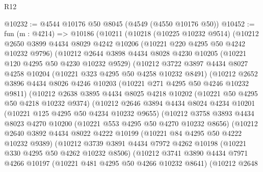 \begin{lexlean}{R12}
\begin{coremodule}
@10232 := @4544 @10176 @50 @8045 (@4549 (@4550 @10176 @50))
@10452 := fun (m : @4214) =>
  @10186
    (@10211
      (@10218
        (@10225 @10232 @9514)
        (@10212
          @2650
          @3899
          @4434
          @8029
          @4242
          @10206
          (@10221 @220 @4295 @50 @4242 @10232 @9796)
          (@10212
            @2644
            @3898
            @4434
            @8028
            @4230
            @10205
            (@10221 @120 @4295 @50 @4230 @10232 @9529)
            (@10212
              @3722
              @3897
              @4434
              @8027
              @4258
              @10204
              (@10221 @323 @4295 @50 @4258 @10232 @8491)
              (@10212
                @2652
                @3896
                @4434
                @8026
                @4246
                @10203
                (@10221 @271 @4295 @50 @4246 @10232 @9811)
                (@10212
                  @2638
                  @3895
                  @4434
                  @8025
                  @4218
                  @10202
                  (@10221 @50 @4295 @50 @4218 @10232 @9374)
                  (@10212
                    @2646
                    @3894
                    @4434
                    @8024
                    @4234
                    @10201
                    (@10221 @125 @4295 @50 @4234 @10232 @9655)
                    (@10212
                      @3758
                      @3893
                      @4434
                      @8023
                      @4270
                      @10200
                      (@10221 @553 @4295 @50 @4270 @10232 @8656)
                      (@10212
                        @2640
                        @3892
                        @4434
                        @8022
                        @4222
                        @10199
                        (@10221 @84 @4295 @50 @4222 @10232 @9389)
                        (@10212
                          @3739
                          @3891
                          @4434
                          @7972
                          @4262
                          @10198
                          (@10221 @330 @4295 @50 @4262 @10232 @8506)
                          (@10212
                            @3741
                            @3890
                            @4434
                            @7971
                            @4266
                            @10197
                            (@10221 @481 @4295 @50 @4266 @10232 @8641)
                            (@10212
                              @2648

\end{coremodule}
\end{lexlean}
